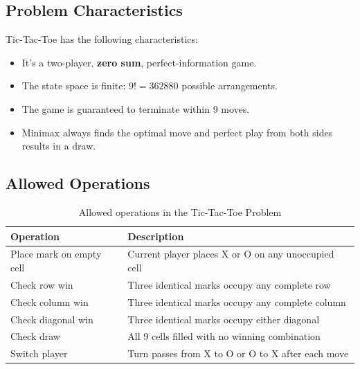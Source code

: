 \documentclass[12pt,a4paper]{report}
\begin{document}
\subsection{Problem Characteristics}
Tic-Tac-Toe has the following characteristics:
\begin{itemize}
    \item It's a two-player, \textbf{zero sum}, perfect-information game.
    \item The state space is finite: $9! = 362880$ possible arrangements.
    \item The game is guaranteed to terminate within 9 moves.
    \item Minimax always finds the optimal move and perfect play from both sides results in a draw.
\end{itemize}

\subsection{Allowed Operations}
\begin{table}[H]
\centering
\begin{tabular}{ll}
\toprule
\textbf{Operation} & \textbf{Description} \\
\midrule
Place mark on empty cell & Current player places X or O on any unoccupied cell \\
Check row win           & Three identical marks occupy any complete row \\
Check column win        & Three identical marks occupy any complete column \\
Check diagonal win      & Three identical marks occupy either diagonal \\
Check draw              & All 9 cells filled with no winning combination \\
Switch player           & Turn passes from X to O or O to X after each move \\
\bottomrule
\end{tabular}
\caption{Allowed operations in the Tic-Tac-Toe Problem}
\end{table}
\newpage
\end{document}
